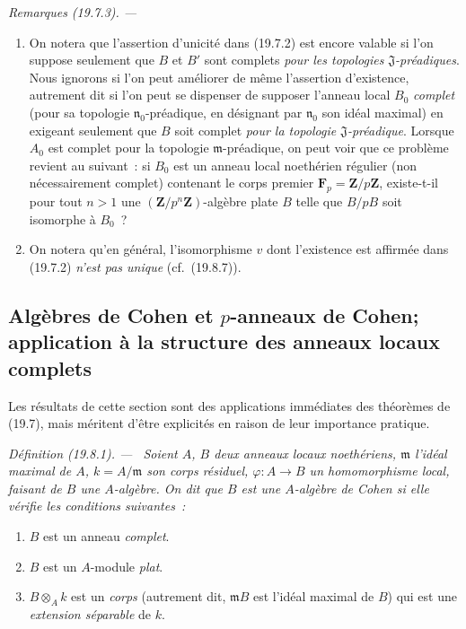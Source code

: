 \documentclass[10pt,oneside]{book}
\makeatletter
\newcommand{\setmanualcurrentlabel}[1]{\def\@currentlabel{#1}}
\newenvironment{definition}[1][]{%
  \setmanualcurrentlabel{#1}\par\medskip\noindent\itshape Définition (#1). ---\ }{\par}
\newenvironment{remarks}[1][]{%
  \setmanualcurrentlabel{#1}\par\medskip\noindent\itshape Remarques (#1). ---\ }{\par}
\makeatother
\begin{document}
\begin{remarks}[19.7.3]
\label{0.19.7.3-fr}
\begin{enumerate}
  \item[(i)] On notera que l'assertion d'unicité dans (19.7.2) est encore
  valable si l'on suppose seulement que $B$ et $B'$ sont complets \emph{pour
  les topologies $\mathfrak J$-préadiques}. Nous ignorons si l'on peut
  améliorer de même l'assertion d'existence, autrement dit si l'on peut se
  dispenser de supposer l'anneau local $B_0$ \emph{complet} (pour sa topologie
  $\mathfrak n_0$-préadique, en désignant par $\mathfrak n_0$ son idéal
  maximal) en exigeant seulement que $B$ soit complet \emph{pour la topologie
  $\mathfrak J$-préadique}. Lorsque $A_0$ est complet pour la topologie
  $\mathfrak m$-préadique, on peut voir que ce problème revient au suivant~:
  si $B_0$ est un anneau local noethérien régulier (non nécessairement
  complet) contenant le corps premier $\mathbf F_p=\mathbf Z/p\mathbf Z$,
  existe-t-il pour tout $n>1$ une $(\mathbf Z/p^n\mathbf Z)$-algèbre plate $B$
  telle que $B/pB$ soit isomorphe à $B_0$~?
  \item[(ii)] On notera qu'en général, l'isomorphisme $v$ dont l'existence est
  affirmée dans (19.7.2) \emph{n'est pas unique} (cf.~(19.8.7)).
\end{enumerate}
\end{remarks}

\subsection{Algèbres de Cohen et $p$-anneaux de Cohen; application à la
structure des anneaux locaux complets}
\label{subsection:0.19.8-fr}

Les résultats de cette section sont des applications immédiates des théorèmes
de (19.7), mais méritent d'être explicités en raison de leur importance
pratique.

\begin{definition}[19.8.1]
\label{0.19.8.1-fr}
Soient $A$, $B$ deux anneaux locaux noethériens, $\mathfrak m$ l'idéal maximal
de $A$, $k=A/\mathfrak m$ son corps résiduel,
$\varphi:A\to B$ un homomorphisme local, faisant de $B$ une $A$-algèbre. On
dit que $B$ est une \emph{$A$-algèbre de Cohen} si elle vérifie les conditions
suivantes~:
\begin{enumerate}
  \item[(i)] $B$ est un anneau \emph{complet}.
  \item[(ii)] $B$ est un $A$-module \emph{plat}.
  \item[(iii)] $B\otimes_A k$ est un \emph{corps} (autrement dit,
  $\mathfrak mB$ est l'idéal maximal de $B$) qui est une \emph{extension
  séparable} de $k$.
\end{enumerate}
\end{definition}
\end{document}
